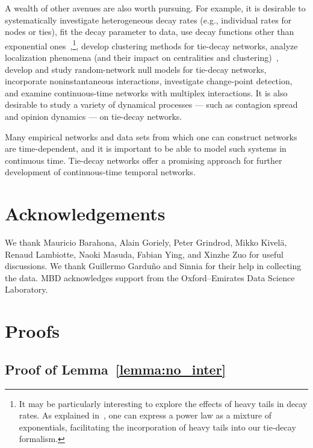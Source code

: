 \documentclass[journal,transmag]{IEEEtran}
\begin{document}
A wealth of other avenues are also worth pursuing. For example, it is desirable to 
systematically investigate heterogeneous
decay rates (e.g., individual
rates for nodes or ties), fit the decay parameter to data, use
decay functions other than exponential ones~\cite{gleeson2014,
  yang2018},\footnote{It may be particularly interesting to explore
  the effects of heavy tails in decay rates. As explained
  in~\cite{Masuda2018}, one can express a power law as a mixture of
  exponentials, facilitating the incorporation of heavy tails into our tie-decay formalism.}, develop clustering methods for tie-decay networks,
analyze localization phenomena (and their impact on centralities
and clustering)~\cite{martin2014,Taylor2015}, develop and study
random-network null models for tie-decay networks, incorporate
noninstantaneous interactions, investigate change-point detection, and examine
continuous-time networks with multiplex interactions. It is also desirable to study a variety of dynamical processes --- such as contagion spread and opinion dynamics --- on tie-decay networks.

Many empirical networks and data sets from which one can construct networks
are time-dependent, and it is important to be
able to model such systems in continuous time. Tie-decay networks
offer a promising approach for further development of continuous-time
temporal networks.



\section*{Acknowledgements}

We thank Mauricio Barahona, Alain Goriely, Peter Grindrod, Mikko
Kivel\"a, Renaud Lambiotte, Naoki Masuda, Fabian Ying, and Xinzhe Zuo
for useful discussions. We thank Guillermo Gardu\~no and Sinnia for
their help in collecting the data. MBD acknowledges support from the Oxford--Emirates Data Science Laboratory.



\appendix

\section{Proofs} \label{sec:proof_boundPR}


\subsection{Proof of Lemma~\ref{lemma:no_inter}}
\end{document}
